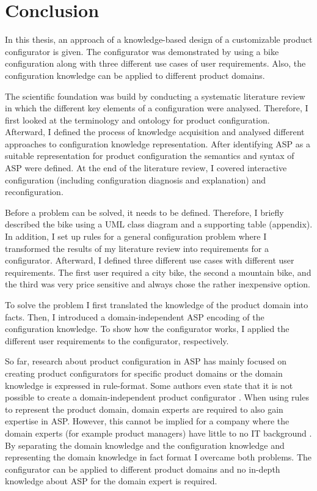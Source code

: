 \section{Conclusion}\label{sec: Conclusion}
In this thesis, an approach of a knowledge-based design of a customizable product configurator is given. The configurator was demonstrated by using a bike configuration along with three different use cases of user requirements. Also, the configuration knowledge can be applied to different product domains. \newline

The scientific foundation was build by conducting a systematic literature review in which the different key elements of a configuration were analysed. Therefore, I first looked at the terminology and ontology for product configuration. Afterward, I defined the process of knowledge acquisition and analysed different approaches to configuration knowledge representation. After identifying ASP as a suitable representation for product configuration the semantics and syntax of ASP were defined. At the end of the literature review, I covered interactive configuration (including configuration diagnosis and explanation) and reconfiguration. \newline

Before a problem can be solved, it needs to be defined. Therefore, I briefly described the bike using a UML class diagram and a supporting table (appendix). In addition, I set up rules for a general configuration problem where I transformed the results of my literature review into requirements for a configurator. Afterward, I defined three different use cases with different user requirements. The first user required a city bike, the second a mountain bike, and the third was very price sensitive and always chose the rather inexpensive option. \newline

To solve the problem I first translated the knowledge of the product domain into facts. Then, I introduced a domain-independent ASP encoding of the configuration knowledge. To show how the configurator works, I applied the different user requirements to the configurator, respectively.  \newline

So far, research about product configuration in ASP has mainly focused on creating product configurators for specific product domains or the domain knowledge is expressed in rule-format. Some authors even state that it is not possible to create a domain-independent product configurator \cite{junker06a}. When using rules to represent the product domain, domain experts are required to also gain expertise in ASP. However, this cannot be implied for a company where the domain experts (for example product managers) have little to no IT background \cite{zhang14a}. By separating the domain knowledge and the configuration knowledge and representing the domain knowledge in fact format I overcame both problems. The configurator can be applied to different product domains and no in-depth knowledge about ASP for the domain expert is required. 
\newpage
